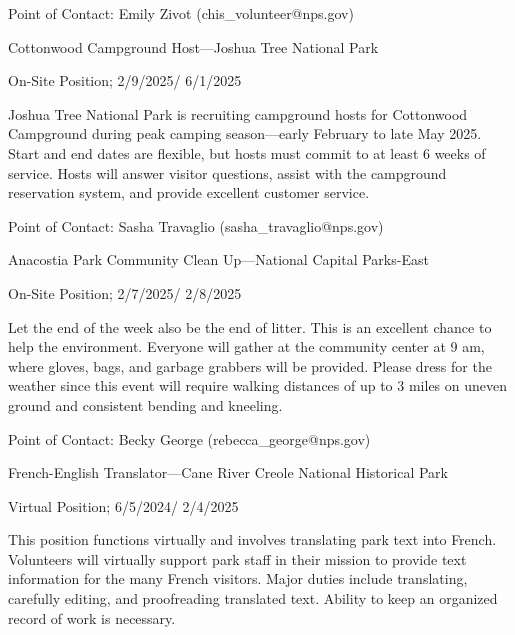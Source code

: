 \documentclass{英语试卷}
\begin{document}
\par Point of Contact: Emily Zivot (chis\_volunteer@nps.gov)\par
\par Cottonwood Campground Host—Joshua Tree National Park\par
\par On-Site Position; 2/9/2025/ 6/1/2025\par
\par Joshua Tree National Park is recruiting campground hosts for Cottonwood Campground during peak camping season—early February to late May 2025. Start and end dates are flexible, but hosts must commit to at least 6 weeks of service. Hosts will answer visitor questions, assist with the campground reservation system, and provide excellent customer service.\par
\par Point of Contact: Sasha Travaglio (sasha\_travaglio@nps.gov)\par
\par Anacostia Park Community Clean Up—National Capital Parks-East\par
\par On-Site Position; 2/7/2025/ 2/8/2025\par
\par Let the end of the week also be the end of litter. This is an excellent chance to help the environment. Everyone will gather at the community center at 9 am, where gloves, bags, and garbage grabbers will be provided. Please dress for the weather since this event will require walking distances of up to 3 miles on uneven ground and consistent bending and kneeling.\par
\par Point of Contact: Becky George (rebecca\_george@nps.gov)\par
\par French-English Translator—Cane River Creole National Historical Park\par
\par Virtual Position; 6/5/2024/ 2/4/2025\par
\par This position functions virtually and involves translating park text into French. Volunteers will virtually support park staff in their mission to provide text information for the many French visitors. Major duties include translating, carefully editing, and proofreading translated text. Ability to keep an organized record of work is necessary.\par
\end{document}
